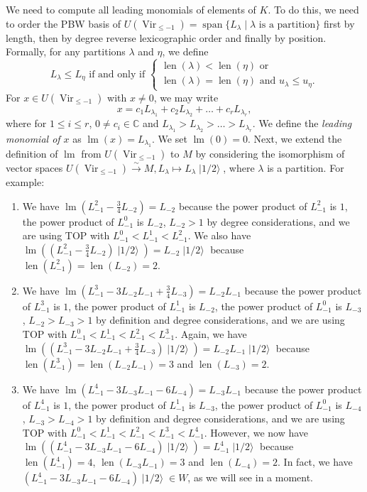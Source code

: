 \documentclass[a4paper, 12pt, reqno]{amsart}
\theoremstyle{remark}
\DeclareMathOperator{\Vir}{Vir}
\DeclareMathOperator{\lm}{lm}
\DeclareMathOperator{\vspan}{span}
\DeclareMathOperator{\len}{len}
\DeclareMathOperator{\vachalf}{|1/2\rangle}
\begin{document}
We need to compute all leading monomials of elements of $K$.
To do this, we need to order the PBW basis of $U(\Vir_{\le -1}) = \vspan\{L_{\lambda} \mid \text{$\lambda$ is a partition}\}$ first by length, then by degree reverse lexicographic order and finally by position.
Formally, for any partitions $\lambda$ and $\eta$, we define
\begin{equation*}
  L_{\lambda} \le L_{\eta}\text{ if and only if }
  \begin{cases}
    \len(\lambda) < \len(\eta)\text{ or } \\
    \len(\lambda) = \len(\eta)\text{ and }u_{\lambda} \le u_{\eta}.
  \end{cases}
\end{equation*}
For $x \in U(\Vir_{\le -1})$ with $x \neq 0$, we may write
\begin{equation*}
  x = c_1L_{\lambda_1} + c_2L_{\lambda_2} + \dots + c_rL_{\lambda_r},
\end{equation*}
where for $1 \le i \le r$, $0 \neq c_i \in \mathbb{C}$ and $L_{\lambda_1} > L_{\lambda_2} > \dots > L_{\lambda_r}$.
We define the \emph{leading monomial of $x$} as $\lm(x) = L_{\lambda_1}$.
We set $\lm(0) = 0$.
Next, we extend the definition of $\lm$ from $U(\Vir_{\le -1})$ to $M$ by considering the isomorphism of vector spaces $U(\Vir_{\le -1}) \xrightarrow{\sim} M, L_{\lambda} \mapsto L_{\lambda}\vachalf$, where $\lambda$ is a partition.
For example:
\begin{enumerate}
\item We have $\lm(L_{-1}^2 - \frac{3}{4}L_{-2}) = L_{-2}$ because the power product of $L_{-1}^2$ is $1$, the power product of $L_{-1}^0$ is $L_{-2}$, $L_{-2} > 1$ by degree considerations, and we are using TOP with $L_{-1}^0 < L_{-1}^1 < L_{-1}^2$.
  We also have $\lm((L_{-1}^2 - \frac{3}{4}L_{-2})\vachalf) = L_{-2}\vachalf$ because $\len(L_{-1}^2) = \len(L_{-2}) = 2$.
\item We have $\lm(L_{-1}^3 - 3L_{-2}L_{-1} + \frac{3}{4}L_{-3}) = L_{-2}L_{-1}$ because the power product of $L_{-1}^3$ is $1$, the power product of $L_{-1}^1$ is $L_{-2}$, the power product of $L_{-1}^0$ is $L_{-3}$, $L_{-2} > L_{-3} > 1$ by definition and degree considerations, and we are using TOP with $L_{-1}^0 < L_{-1}^1 < L_{-1}^2 < L_{-1}^3$.
  Again, we have $\lm((L_{-1}^3 - 3L_{-2}L_{-1} + \frac{3}{4}L_{-3})\vachalf) = L_{-2}L_{-1}\vachalf$ because $\len(L_{-1}^3) = \len(L_{-2}L_{-1}) = 3$ and $\len(L_{-3}) = 2$.
\item We have $\lm(L_{-1}^4 - 3L_{-3}L_{-1} - 6L_{-4}) = L_{-3}L_{-1}$ because the power product of $L_{-1}^4$ is $1$, the power product of $L_{-1}^1$ is $L_{-3}$, the power product of $L_{-1}^0$ is $L_{-4}$, $L_{-3} > L_{-4} > 1$ by definition and degree considerations, and we are using TOP with $L_{-1}^0 < L_{-1}^1 < L_{-1}^2 < L_{-1}^3 < L_{-1}^4$.
  However, we now have $\lm((L_{-1}^4 - 3L_{-3}L_{-1} - 6L_{-4})\vachalf) = L_{-1}^4\vachalf$ because $\len(L_{-1}^4) = 4$, $\len(L_{-3}L_{-1}) = 3$ and $\len(L_{-4}) = 2$.
  In fact, we have $(L_{-1}^4 - 3L_{-3}L_{-1} - 6L_{-4})\vachalf \in W$, as we will see in a moment.
\end{enumerate}
\end{document}
